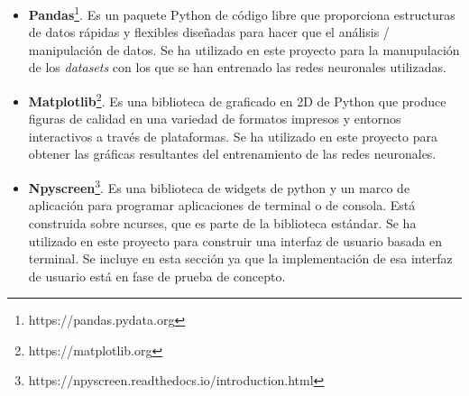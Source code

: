 \begin{itemize}
    \item \textbf{Pandas}\footnote{https://pandas.pydata.org}. Es un paquete Python de código libre que proporciona estructuras de datos rápidas y flexibles diseñadas para hacer que el  análisis / manipulación de datos. Se ha utilizado en este proyecto para la manupulación de los \textit{datasets} con los que se han entrenado las redes neuronales utilizadas.
    \item \textbf{Matplotlib}\footnote{https://matplotlib.org}. Es una biblioteca de graficado en 2D de Python que produce figuras de calidad en una variedad de formatos impresos y entornos interactivos a través de plataformas. Se ha utilizado en este proyecto para obtener las gráficas resultantes del entrenamiento de las redes neuronales.
    \item \textbf{Npyscreen}\footnote{https://npyscreen.readthedocs.io/introduction.html}. Es una biblioteca de widgets de python y un marco de aplicación para programar aplicaciones de terminal o de consola. Está construida sobre ncurses, que es parte de la biblioteca estándar. Se ha utilizado en este proyecto para construir una interfaz de usuario basada en terminal. Se incluye en esta sección ya que la implementación de esa interfaz de usuario está en fase de prueba de concepto.
\end{itemize}


